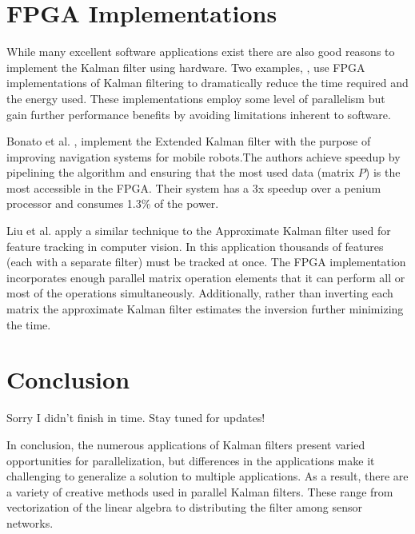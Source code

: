 \documentclass[11pt]{article}
\begin{document}
\section{FPGA Implementations}
While many excellent software applications exist there are also good reasons to implement the Kalman filter using hardware. Two examples,  \cite{bonato2009floating,liu2007efficient}, use FPGA implementations of Kalman filtering to dramatically reduce the time required and the energy used. These implementations employ some level of parallelism but gain further performance benefits by avoiding limitations inherent to software.

Bonato et al. \cite{bonato2009floating}, implement the Extended Kalman filter with the purpose of improving navigation systems for mobile robots.The authors achieve speedup by pipelining the algorithm and ensuring that the most used data (matrix $P$) is the most accessible in the FPGA. Their system has a 3x speedup over a penium processor and consumes 1.3\% of the power. 

Liu et al. \cite{liu2007efficient} apply a similar technique to the Approximate Kalman filter used for feature tracking in computer vision. In this application thousands of features (each with a separate filter) must be tracked at once. The FPGA implementation incorporates enough parallel matrix operation elements that it can perform all or most of the operations simultaneously. Additionally, rather than inverting each matrix the approximate Kalman filter estimates the inversion further minimizing the time.

\section{Conclusion}
Sorry I didn't finish in time. Stay tuned for updates!

In conclusion, the numerous applications of Kalman filters present varied opportunities for parallelization, but differences in the applications make it challenging to generalize a solution to multiple applications. As a result, there are a variety of creative methods used in parallel Kalman filters. These range from vectorization of the linear algebra to distributing the filter among sensor networks.

\nocite{*}


\end{document}
